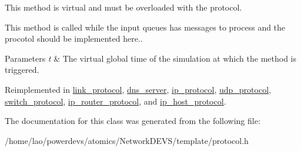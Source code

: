 This method is virtual and must be overloaded with the protocol. 

This method is called while the input queues has messages to process and the procotol should be implemented here..


\begin{DoxyParams}{Parameters}
{\em t} & The virtual global time of the simulation at which the method is triggered. \\
\hline
\end{DoxyParams}


Reimplemented in \hyperlink{classlink__protocol_abae9797f2bf160152cf43bd011742d22}{link\+\_\+protocol}, \hyperlink{classdns__server_a51e296892a2de8776c83689f172a0797}{dns\+\_\+server}, \hyperlink{classip__protocol_a5c4dd62ee8cffa83a592f29306686be9}{ip\+\_\+protocol}, \hyperlink{classudp__protocol_aab75d26186e52fc49ba9f8b88fba0071}{udp\+\_\+protocol}, \hyperlink{classswitch__protocol_a7dd0e54d6b2a3683a5be387cffa99a22}{switch\+\_\+protocol}, \hyperlink{classip__router__protocol_a14cf3c7e1418ee8c6035b79626f99438}{ip\+\_\+router\+\_\+protocol}, and \hyperlink{classip__host__protocol_a2e2c43aeb81ae38702b7dec6f7df9227}{ip\+\_\+host\+\_\+protocol}.



The documentation for this class was generated from the following file\+:\begin{DoxyCompactItemize}
\item 
/home/lao/powerdevs/atomics/\+Network\+D\+E\+V\+S/template/protocol.\+h\end{DoxyCompactItemize}

